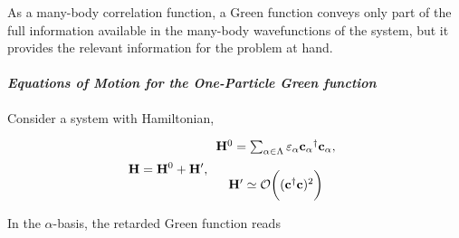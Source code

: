 As a many-body correlation function, a Green function conveys only part of the full information available in the many-body wavefunctions of the system, but it provides the relevant information for the problem at hand. \\

\paragraph{\textit{Equations of Motion for the One-Particle Green function}}

Consider a system with Hamiltonian, 

\begin{equation}
    {{\bf H}} = {{\bf H}}^{0} + {{\bf H}}', \begin{array}{c}
         {{\bf H}}^{0} = \sum_{\alpha \in \Lambda} \varepsilon_{\alpha} {{\bf c}_{\alpha}}^\dagger {{\bf c}_{\alpha}}, \\  
         \\
         {\bf H}' \simeq \mathcal{O}\bigg(({{\bf c}}^\dagger {{\bf c}})^2\bigg) \\
    \end{array}
\end{equation}

In the $\alpha$-basis, the retarded Green function reads 

